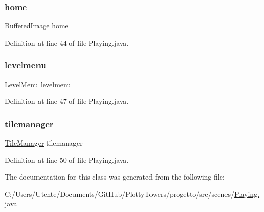 \subsubsection{\texorpdfstring{home}{home}}
{\footnotesize\ttfamily Buffered\+Image home\hspace{0.3cm}{\ttfamily [private]}}



Definition at line 44 of file Playing.\+java.

\mbox{\label{classscenes_1_1_playing_aca1e89235089681ebcb39681c50becae}} 
\subsubsection{\texorpdfstring{levelmenu}{levelmenu}}
{\footnotesize\ttfamily \hyperlink{classui_1_1_level_menu}{Level\+Menu} levelmenu\hspace{0.3cm}{\ttfamily [private]}}



Definition at line 47 of file Playing.\+java.

\mbox{\label{classscenes_1_1_playing_a6d3aeeb21b7d0a3598a949b8c244f7bf}} 
\subsubsection{\texorpdfstring{tilemanager}{tilemanager}}
{\footnotesize\ttfamily \hyperlink{classmanagers_1_1_tile_manager}{Tile\+Manager} tilemanager\hspace{0.3cm}{\ttfamily [private]}}



Definition at line 50 of file Playing.\+java.



The documentation for this class was generated from the following file\+:\begin{DoxyCompactItemize}
\item 
C\+:/\+Users/\+Utente/\+Documents/\+Git\+Hub/\+Plotty\+Towers/progetto/src/scenes/\hyperlink{_playing_8java}{Playing.\+java}\end{DoxyCompactItemize}
